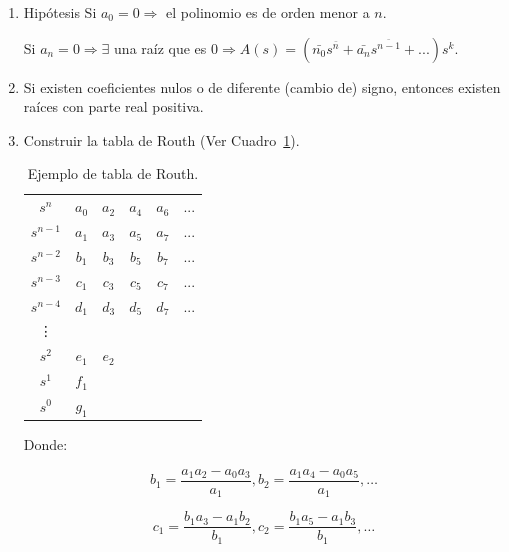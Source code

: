        \begin{enumerate}
            \item Hipótesis
                Si $a_0 = 0 \Rightarrow$ el polinomio es de orden menor a $n$.

                Si $a_n = 0 \Rightarrow \exists$ una raíz que es $0 \Rightarrow A(s) = (\bar{n_0} s^{\bar{n}} + \bar{a_n} s^{\bar{n-1}} + ...) s^k $.

            \item Si existen coeficientes nulos o de diferente (cambio de) signo, entonces existen raíces con parte real positiva.
            \item Construir la tabla de Routh (Ver Cuadro~\ref{tab:Routh}).

            \begin{table}[htbp]
                \centering
                \begin{tabular}{c|c c c c c}
                    $s^n$     & $a_0$ & $a_2$ & $a_4$ & $a_6$ & ...\\
                    $s^{n-1}$ & $a_1$ & $a_3$ & $a_5$ & $a_7$ & ...\\
                    $s^{n-2}$ & $b_1$ & $b_3$ & $b_5$ & $b_7$ & ...\\
                    $s^{n-3}$ & $c_1$ & $c_3$ & $c_5$ & $c_7$ & ...\\
                    $s^{n-4}$ & $d_1$ & $d_3$ & $d_5$ & $d_7$ & ...\\
                    \vdots                                         \\
                    $s^2$ & $e_1$ & $e_2$                          \\
                    $s^1$ & $f_1$                                  \\
                    $s^0$ & $g_1$
                \end{tabular}
                \caption{\label{tab:Routh}Ejemplo de tabla de Routh.}
            \end{table}

            Donde:

            \begin{equation*}
            b_1 = \frac{a_1 a_2 - a_0 a_3}{a_1} , b_2 = \frac{a_1 a_4 - a_0 a_5}{a_1} , \dots
            \end{equation*}

            \begin{equation*}
            c_1 = \frac{b_1 a_3 - a_1 b_2}{b_1} , c_2 = \frac{b_1 a_5 - a_1 b_3}{b_1} , \dots
            \end{equation*}


\end{enumerate}
